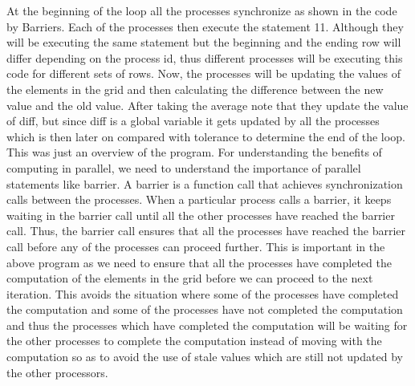 \documentclass[12pt]{article}
\begin{document}
At the beginning of the loop all the processes synchronize as shown in the code by Barriers.
Each of the processes then execute the statement 11. Although they will be executing the same statement but the beginning and the ending row will differ depending 
on the process id, thus different processes will be executing this code for different sets of rows.
Now, the processes will be updating the values of the elements in the grid and then calculating the difference between the new value and the old value. After taking the average note that they 
update the value of diff, but since diff is a global variable it gets updated by all the processes which is then later on compared with tolerance to determine the end of the loop.
This was just an overview of the program. For understanding the benefits of computing in parallel, we need to understand the importance of parallel statements like barrier.
A barrier is a function call that achieves synchronization calls between the processes. When a particular process calls a barrier, it keeps waiting in the barrier call until all the other processes have reached the barrier call.
Thus, the barrier call ensures that all the processes have reached the barrier call before any of the processes can proceed further. This is important in the above program as we need to ensure that all the processes have completed the computation of the elements in the grid before we can proceed to the next iteration.
This avoids the situation where some of the processes have completed the computation and some of the processes have not completed the computation and thus the processes which have completed the computation will be waiting for the other processes to complete the computation
instead of moving with the computation so as to avoid the use of stale values which are still not updated by the other processors.
\end{document}
